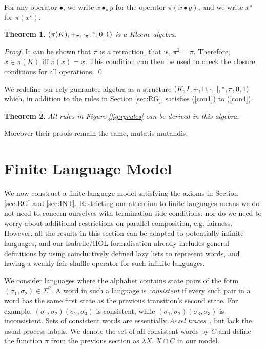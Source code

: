 \documentclass{llncs}
\newtheorem{thm}{Theorem}
\begin{document}
For any operator $\bullet$, we write $x \bullet_\pi y$ for the
operator $\pi(x\bullet y)$, and we write $x^\pi$ for
$\pi(x^\star)$.
\begin{thm}
$(\pi(K), +_\pi, \cdot_\pi, \hphantom{}^\pi,0,1)$ is a Kleene algebra.
\end{thm}
\begin{proof}
  It can be shown that $\pi$ is a retraction, that is, $\pi^2 =
  \pi$. Therefore, $x\in \pi(K)$ iff $\pi(x) = x$. This condition can
  then be used to check the closure conditions for all operations. \qed
\end{proof}

We redefine our rely-guarantee algebra as a structure
$(K,I,+,\sqcap,\cdot,\|,\hphantom{}^\star,\pi,0,1)$ which, in addition
to the rules in Section \ref{sec:RG}, satisfies (\ref{con1}) to
(\ref{con4}).
\begin{thm}
  All rules in Figure \ref{fig:rgrules} can be derived in this
  algebra.
\end{thm}
Moreover their proofs remain the same, mutatis mutandis.

\section{Finite Language Model}
\label{sec:Model}

We now construct a finite language model satisfying the axioms in
Section \ref{sec:RG} and \ref{sec:INT}. Restricting our attention to
finite languages means we do not need to concern ourselves with
termination side-conditions, nor do we need to worry about additional
restrictions on parallel composition, e.g. fairness. However, all the
results in this section can be adapted to potentially infinite
languages, and our Isabelle/HOL formalisation already includes general
definitions by using coinductively defined lazy lists to represent
words, and having a weakly-fair shuffle operator for such infinite
languages.

We consider languages where the alphabet contains state pairs of the
form $(\sigma_1,\sigma_2) \in \Sigma^2$. A word in such a language is
\emph{consistent} if every such pair in a word has the same first
state as the previous transition's second state. For example,
$(\sigma_1,\sigma_2)(\sigma_2,\sigma_3)$ is consistent, while
$(\sigma_1,\sigma_2)(\sigma_3,\sigma_3)$ is inconsistent. Sets of
consistent words are essentially \emph{Aczel
  traces}~\cite{boer_formal_1999}, but lack the usual process
labels. We denote the set of all consistent words by $C$ and define
the function $\pi$ from the previous section as $\lambda X.\; X \cap
C$ in our model.
\end{document}
